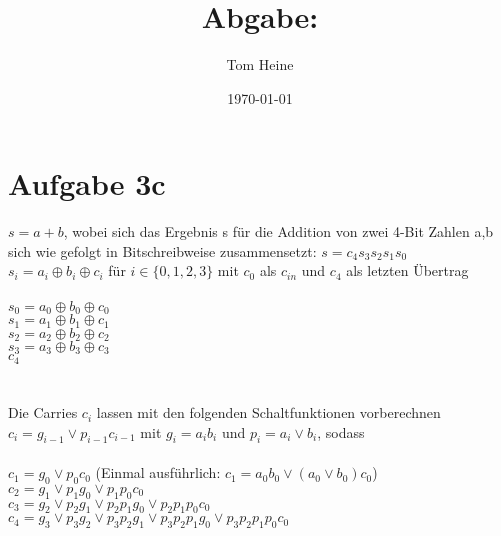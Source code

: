 \documentclass[12pt,a4paper]{scrartcl}
\author{Tom Heine}
\title{Abgabe:}
\date{\today}
\begin{document}
\newpage
	
\section*{Aufgabe 3c}
	$s = a + b$, wobei sich das Ergebnis s für die Addition von zwei 4-Bit Zahlen a,b sich wie gefolgt in Bitschreibweise zusammensetzt: $s = c_4 s_3s_2s_1s_0$ \\
	$s_i = a_i \oplus b_i \oplus c_i$ für $i \in \{0,1,2,3\}$ mit $c_0$ als $c_{in}$ und $c_4$ als letzten Übertrag \\
	\\
	$s_0 = a_0 \oplus b_0 \oplus c_0$ \\
	$s_1 = a_1 \oplus b_1 \oplus c_1$ \\
	$s_2 = a_2 \oplus b_2 \oplus c_2$ \\
	$s_3 = a_3 \oplus b_3 \oplus c_3$ \\
	$c_4$ \\
	\\
	\\
	Die Carries $c_i$ lassen mit den folgenden Schaltfunktionen vorberechnen \\
	$c_i = g_{i-1} \lor p_{i-1}c_{i-1}$ mit $g_i = a_ib_i$ und $p_i = a_i \lor b_i$, sodass \\
	\\
	$c_1 = g_0 \lor p_0c_0$  (Einmal ausführlich: $c_1 = a_0b_0 \lor (a_0 \lor b_0)c_0$)\\
	$c_2 = g_1 \lor p_1g_0 \lor p_1p_0c_0$ \\
	$c_3 = g_2 \lor p_2g_1 \lor p_2p_1g_0 \lor p_2p_1p_0c_0$ \\
	$c_4 = g_3 \lor p_3g_2 \lor p_3p_2g_1 \lor p_3p_2p_1g_0 \lor p_3p_2p_1p_0c_0$ \\
\end{document}
